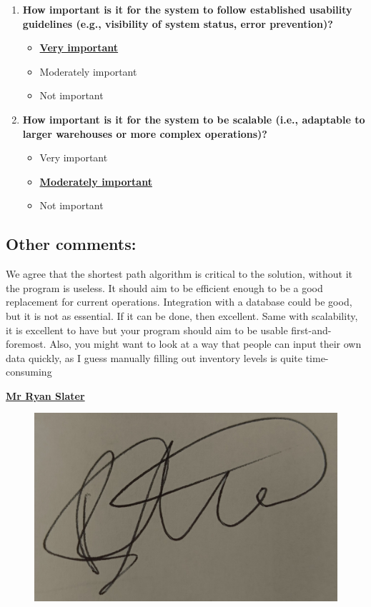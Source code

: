 \begin{enumerate}
    \item \textbf{How important is it for the system to follow established usability guidelines (e.g., visibility of system status, error prevention)?}
    \begin{itemize}
        \item \textbf{\underline{Very important}}
        \item Moderately important
        \item Not important
    \end{itemize}

    \item \textbf{How important is it for the system to be scalable (i.e., adaptable to larger warehouses or more complex operations)?}
    \begin{itemize}
        \item Very important
        \item \textbf{\underline{Moderately important}}
        \item Not important
    \end{itemize}
\end{enumerate}

\newpage
\subsection*{Other comments:}

We agree that the shortest path algorithm is critical to the solution, without it the program is useless. It should aim to be efficient enough to be a good replacement for current operations. Integration with a database could be good, but it is not as essential. If it can be done, then excellent. Same with scalability, it is excellent to have but your program should aim to be usable first-and-foremost. Also, you might want to look at a way that people can input their own data quickly, as I guess manually filling out inventory levels is quite time-consuming
\vspace{0.7cm}
\newline

\textbf{\underline{Mr Ryan Slater}} \newline

\begin{figure}[!htbp]
    \centering
    \includegraphics[width=0.2\linewidth]{IMG_20241213_124653362.jpg}
\end{figure}

